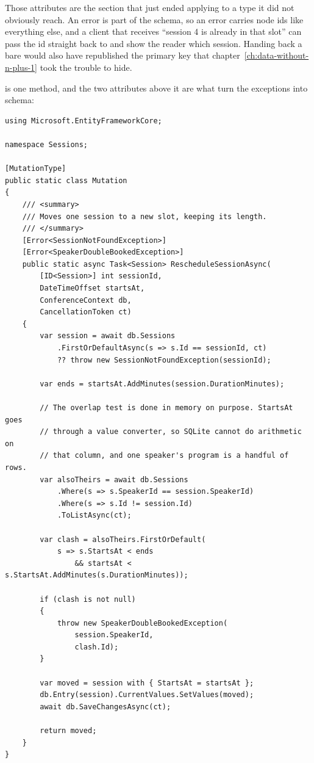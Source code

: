 %
Those \code{[ID<T>]} attributes are the section that just ended applying to a
type it did not obviously reach. An error is part of the schema, so an error
carries node ids like everything else, and a client that receives
\enquote{session 4 is already in that slot} can pass the id straight back to
 and show the reader which session. Handing back a bare 
would also have republished the primary key that
chapter~\ref{ch:data-without-n-plus-1} took the trouble to hide.

%
 is one method, and the two attributes above it are what
turn the exceptions into schema:

\begin{verbatim}
using Microsoft.EntityFrameworkCore;

namespace Sessions;

[MutationType]
public static class Mutation
{
    /// <summary>
    /// Moves one session to a new slot, keeping its length.
    /// </summary>
    [Error<SessionNotFoundException>]
    [Error<SpeakerDoubleBookedException>]
    public static async Task<Session> RescheduleSessionAsync(
        [ID<Session>] int sessionId,
        DateTimeOffset startsAt,
        ConferenceContext db,
        CancellationToken ct)
    {
        var session = await db.Sessions
            .FirstOrDefaultAsync(s => s.Id == sessionId, ct)
            ?? throw new SessionNotFoundException(sessionId);

        var ends = startsAt.AddMinutes(session.DurationMinutes);

        // The overlap test is done in memory on purpose. StartsAt goes
        // through a value converter, so SQLite cannot do arithmetic on
        // that column, and one speaker's program is a handful of rows.
        var alsoTheirs = await db.Sessions
            .Where(s => s.SpeakerId == session.SpeakerId)
            .Where(s => s.Id != session.Id)
            .ToListAsync(ct);

        var clash = alsoTheirs.FirstOrDefault(
            s => s.StartsAt < ends
                && startsAt < s.StartsAt.AddMinutes(s.DurationMinutes));

        if (clash is not null)
        {
            throw new SpeakerDoubleBookedException(
                session.SpeakerId,
                clash.Id);
        }

        var moved = session with { StartsAt = startsAt };
        db.Entry(session).CurrentValues.SetValues(moved);
        await db.SaveChangesAsync(ct);

        return moved;
    }
}
\end{verbatim}

